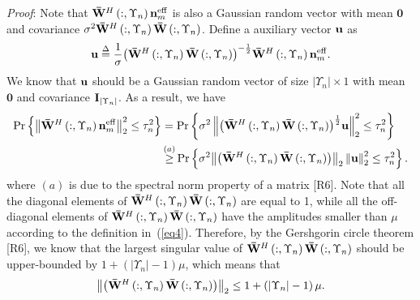 \documentclass[a4paper,12pt]{article}
\begin{document}
{\begin{framed}
{{\it Proof}: Note that ${{{\bf{\bar W}}^H}\left( {:,{\Upsilon _n}} \right){\bf{n}}_m^{{\rm{eff}}}}$ is also a Gaussian random vector with mean ${\mathbf{0}}$ and covariance ${{\sigma ^2}{{\bf{\bar W}}^H}\left( {:,{\Upsilon _n}} \right){\bf{\bar W}}\left( {:,{\Upsilon _n}} \right)}$. Define a auxiliary vector ${{\bf{u}}}$  as
\begin{equation}\label{eq12}
{\bf{u}} \buildrel \Delta \over = \frac{1}{\sigma }{\left( {{{{\bf{\bar W}}}^H}\left( {:,{\Upsilon _n}} \right){\bf{\bar W}}\left( {:,{\Upsilon _n}} \right)} \right)^{ - \frac{1}{2}}}{{\bf{\bar W}}^H}\left( {:,{\Upsilon _n}} \right){\bf{n}}_m^{{\rm{eff}}}.
\end{equation}
We know that ${{\bf{u}}}$ should be a Gaussian random vector of size ${\left| {{\Upsilon _n}} \right| \times 1}$  with mean ${\mathbf{0}}$ and covariance ${{{\bf{I}}_{\left| {{\Upsilon _n}} \right|}}}$. As a result, we have
\begin{align}\label{eq13}
\nonumber \Pr \left\{ {\left\| {{{{\bf{\bar W}}}^H}\left( {:,{\Upsilon _n}} \right){\bf{n}}_m^{{\rm{eff}}}} \right\|_2^2 \le \tau _n^2} \right\} & = \Pr \left\{ {{\sigma ^2}\left\| {{{\left( {{{{\bf{\bar W}}}^H}\left( {:,{\Upsilon _n}} \right){\bf{\bar W}}\left( {:,{\Upsilon _n}} \right)} \right)}^{\frac{1}{2}}}{\bf{u}}} \right\|_2^2 \le \tau _n^2} \right\}\\
& \mathop  \ge \limits^{\left( a \right)} \Pr \left\{ {{\sigma ^2}{{\left\| {\left( {{{{\bf{\bar W}}}^H}\left( {:,{\Upsilon _n}} \right){\bf{\bar W}}\left( {:,{\Upsilon _n}} \right)} \right)} \right\|}_2}\left\| {\bf{u}} \right\|_2^2 \le \tau _n^2} \right\}.
\end{align}
where ${\left( a \right)}$ is due to the spectral norm property of a matrix [R6]. Note that all the diagonal elements of ${{{\bf{\bar W}}^H}\left( {:,{\Upsilon _n}} \right){\bf{\bar W}}\left( {:,{\Upsilon _n}} \right)}$ are equal to 1, while all the off-diagonal elements of ${{{\bf{\bar W}}^H}\left( {:,{\Upsilon _n}} \right){\bf{\bar W}}\left( {:,{\Upsilon _n}} \right)}$ have the amplitudes smaller than ${\mu }$ according to the definition in~(\ref{eq4}). Therefore, by the Gershgorin circle theorem [R6], we know that the largest singular value of ${{{\bf{\bar W}}^H}\left( {:,{\Upsilon _n}} \right){\bf{\bar W}}\left( {:,{\Upsilon _n}} \right)}$ should be upper-bounded by ${1 + \left( {\left| {{\Upsilon _n}} \right| - 1} \right)\mu}$, which means that
\begin{equation}\label{eq14}
{\left\| {\left( {{{{\bf{\bar W}}}^H}\left( {:,{\Upsilon _n}} \right){\bf{\bar W}}\left( {:,{\Upsilon _n}} \right)} \right)} \right\|_2} \le 1 + \left( {\left| {{\Upsilon _n}} \right| - 1} \right)\mu .

\end{equation}}
\end{framed}}
\end{document}
